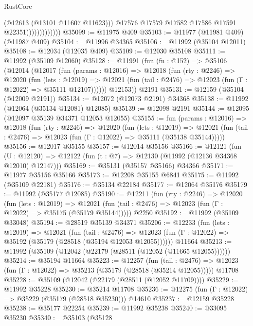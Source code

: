 \begin{lexlean}{RustCore}
\begin{coremodule}
                                (@12613 (@13101 @11607 @11623)))
                              @17576
                              @17579
                              @17582
                              @17586
                              @17591
                              @22351)))))))))))))
@35099 := @11975 @409
@35103 := @11977 (@11981 @409) (@11987 @409)
@35104 := @11996 @34365
@35106 := @11992 (@35104 @12011)
@35108 := @12034 (@12035 @409)
@35109 := @12030 @35108
@35111 := @11992 (@35109 @12060)
@35128 := @11991
    (fun (fn : @152) =>
    @35106
      (@12014
        (@12017
          (fun (params : @12016) =>
          @12018
            (fun (rty : @2246) =>
            @12020
              (fun (lets : @12019) =>
              @12021 (fun (tail : @2476) => @12023 (fun (Γ : @12022) => @35111 @12107))))))
        @12153))
    @2191
@35131 := @12159 (@35104 (@12009 @2191))
@35134 := @12072 (@12073 @2191) @34368
@35138 := @11992 (@12064 (@35134 @12081) @12085)
@35139 := @12098 @2191
@35144 := @12095 (@12097 @35139 @34371 @12053 @12055)
@35155 := fun (params : @12016) =>
  @12018
    (fun (rty : @2246) =>
    @12020
      (fun (lets : @12019) =>
      @12021 (fun (tail : @2476) => @12023 (fun (Γ : @12022) => @35111 (@35138 @35144)))))
@35156 := @12017 @35155
@35157 := @12014 @35156
@35166 := @12121
    (fun (U : @12120) => @12122 (fun (t : @7) => @12130 (@11992 (@12136 @34368 @12010) @12147)))
@35169 := @35131 (@35157 @35166) @34366
@35171 := @11977 @35156 @35166
@35173 := @12208 @35155 @6841
@35175 := @11992 (@35109 @22181)
@35176 := @35134 @22184
@35177 := @12064 @35176
@35179 := @11992 (@35177 @12085)
@35190 := @12211
    (fun (rty : @2246) =>
    @12020
      (fun (lets : @12019) =>
      @12021 (fun (tail : @2476) => @12023 (fun (Γ : @12022) => @35175 (@35179 @35144)))))
    @2250
@35192 := @11992 (@35109 @33048)
@35194 := @28519 @35139 @34371
@35206 := @12233
    (fun (lets : @12019) =>
    @12021
      (fun (tail : @2476) =>
      @12023 (fun (Γ : @12022) => @35192 (@35179 (@28518 (@35194 @12053 @12055))))))
    @11664
@35213 := @11992 (@35109 (@12042 (@22179 (@28511 (@12052 (@11665 @12055))))))
@35214 := @35194 @11664
@35223 := @12257
    (fun (tail : @2476) => @12023 (fun (Γ : @12022) => @35213 (@35179 (@28518 (@35214 @12055)))))
    @11708
@35228 := @35109 (@12042 (@22179 (@28511 (@12052 @11709))))
@35229 := @11992 @35228
@35230 := @35214 @11708
@35236 := @12275 (fun (Γ : @12022) => @35229 (@35179 (@28518 @35230))) @14610
@35237 := @12159 @35228
@35238 := @35177 @22254
@35239 := @11992 @35238
@35240 := @33095 @35230
@35340 := @35103
    (@35128

\end{coremodule}
\end{lexlean}
